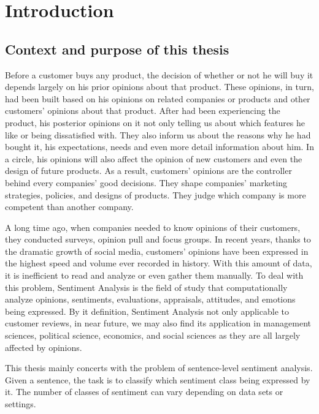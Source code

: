 \hypertarget{chap:intro}{\chapter{Introduction}}
\section{Context and purpose of this thesis}
Before a customer buys any product, the decision of whether or not he will buy it depends largely on his prior opinions about that product. 
These opinions, in turn, had been built based on his opinions on related companies or products and other customers' opinions about that product.  
After had been experiencing the product, his posterior opinions on it not only telling us about which features he like or being dissatisfied with.
They also inform us about the reasons why he had bought it, his expectations, needs and even more detail information about him.
In a circle, his opinions will also affect the opinion of new customers and even the design of future products.
As a result, customers' opinions are the controller behind every companies' good decisions. 
They shape companies' marketing strategies, policies, and designs of products.
They judge which company is more competent than another company.

A long time ago, when companies needed to know opinions of their customers, they conducted surveys, opinion pull and focus groups\cite{liu2012sentiment}. 
In recent years, thanks to the dramatic growth of social media, customers' opinions have been expressed in the highest speed and volume ever recorded in history.
With this amount of data, it is inefficient to read and analyze or even gather them manually.
To deal with this problem, Sentiment Analysis is the field of study that computationally analyze opinions, sentiments, evaluations, appraisals, attitudes, and emotions being expressed\cite{liu2012sentiment}.
By it definition, Sentiment Analysis not only applicable to customer reviews, in near future, we may also find its application in management sciences, political science, economics, and social sciences as they are all largely affected by opinions\cite{liu2012sentiment}. 

This thesis mainly concerts with the problem of sentence-level sentiment analysis. 
Given a sentence, the task is to classify which sentiment class being expressed by it\cite{liu2012sentiment}.
The number of classes of sentiment can vary depending on data sets or settings\cite{Rotten-Tomato}\cite{socher2013recursive}.


